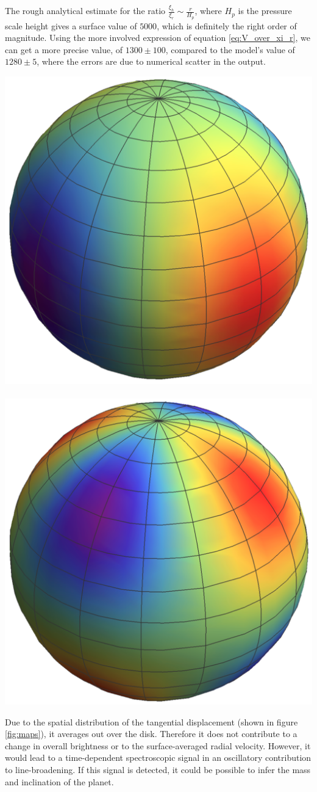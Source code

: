 \documentclass[a0,portrait]{a0poster}
\begin{document}
\begin{multicols}{2}
\begin{tcolorbox}[colframe=black,colback=blue!10!white]
The rough analytical estimate for the ratio $\frac{\xi_{h}}{\xi_{r}} \sim \frac{r}{H_{p}}$, where $H_{p}$ is the pressure scale height gives a surface value of $5000$, which is definitely the right order of magnitude. Using the more involved expression of equation \ref{eq:V_over_xi_r}, we can get a more precise value, of $1300 \pm 100$, compared to the model's value of $1280 \pm 5$, where the errors are due to numerical scatter in the output.

\begin{center}\vspace{1.0cm}
\includegraphics[width=0.40\linewidth]{radial_map_complex_crop_transp}
~
~
~
~
~
~
\includegraphics[width=0.40\linewidth]{tangential_map_complex_crop_transp}
\label{fig:maps}
\end{center}\vspace{1.0cm}


Due to the spatial distribution of the tangential displacement (shown in figure \ref{fig:maps}), it averages out over the disk. Therefore it does not contribute to a change in overall brightness or to the surface-averaged radial velocity. However, it would lead to a time-dependent spectroscopic signal in an oscillatory contribution to line-broadening. If this signal is detected, it could be possible to infer the mass and inclination of the planet.


\end{tcolorbox}
\end{multicols}
\end{document}
